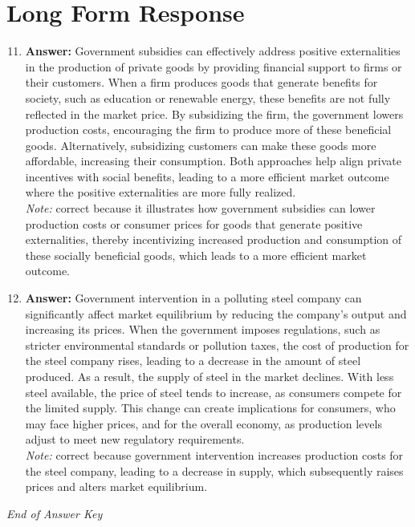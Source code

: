 \documentclass[12pt]{article}
\begin{document}
\section*{Long Form Response}
\begin{enumerate}[label=\arabic*.]
\setcounter{enumi}{10}
\item \textbf{Answer:} Government subsidies can effectively address positive externalities in the production of private goods by providing financial support to firms or their customers. When a firm produces goods that generate benefits for society, such as education or renewable energy, these benefits are not fully reflected in the market price. By subsidizing the firm, the government lowers production costs, encouraging the firm to produce more of these beneficial goods. Alternatively, subsidizing customers can make these goods more affordable, increasing their consumption. Both approaches help align private incentives with social benefits, leading to a more efficient market outcome where the positive externalities are more fully realized.
\\ \textit{Note:} correct because it illustrates how government subsidies can lower production costs or consumer prices for goods that generate positive externalities, thereby incentivizing increased production and consumption of these socially beneficial goods, which leads to a more efficient market outcome.
\item \textbf{Answer:} Government intervention in a polluting steel company can significantly affect market equilibrium by reducing the company's output and increasing its prices. When the government imposes regulations, such as stricter environmental standards or pollution taxes, the cost of production for the steel company rises, leading to a decrease in the amount of steel produced. As a result, the supply of steel in the market declines. With less steel available, the price of steel tends to increase, as consumers compete for the limited supply. This change can create implications for consumers, who may face higher prices, and for the overall economy, as production levels adjust to meet new regulatory requirements.
\\ \textit{Note:} correct because government intervention increases production costs for the steel company, leading to a decrease in supply, which subsequently raises prices and alters market equilibrium.
\end{enumerate}

\vfill
\noindent\textit{End of Answer Key}
\end{document}
